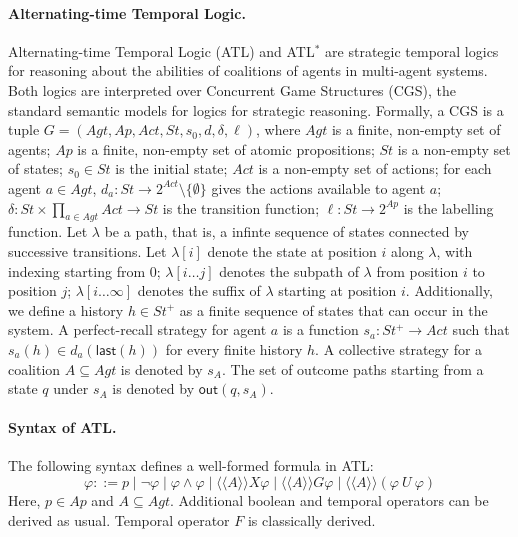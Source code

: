 \paragraph{Alternating-time Temporal Logic.}
Alternating-time Temporal Logic (ATL) and ATL$^\ast$ are strategic temporal logics
for reasoning about the abilities of coalitions of agents in multi-agent systems.
Both logics are interpreted over Concurrent Game Structures (CGS), the standard semantic models for logics for strategic reasoning. Formally, a CGS is a tuple
$G = (Agt, Ap, Act, St, s_0, d, \delta, \ell)$, where $Agt$ is a finite, non-empty set of agents; $Ap$ is a finite, non-empty set of atomic propositions; $St$ is a non-empty set of states; $s_0 \in St$ is the initial state; $Act$ is a non-empty set of actions; for each agent $a \in Agt$, $d_a : St \to 2^{Act} \setminus \{\emptyset\}$ gives the actions available to agent $a$; $\delta : St \times \prod_{a \in Agt} Act \to St$ is the transition function; $\ell : St \to 2^{Ap}$ is the labelling function.
Let $\lambda$ be a path, that is, a infinte sequence of states connected by successive transitions. Let $\lambda[i]$ denote the state at position $i$ along $\lambda$, with indexing starting from $0$; $\lambda[i \dots j]$ denotes the subpath of $\lambda$ from position $i$ to position $j$; $\lambda[i \dots \infty]$ denotes the suffix of $\lambda$ starting at position $i$. Additionally, we define a history $h \in St^+$ as a finite sequence of states that can occur in the system.
A perfect-recall strategy for agent $a$ is a function
$s_a : St^+ \to Act$ such that $s_a(h) \in d_a(\mathsf{last}(h))$ for every finite history $h$.
A collective strategy for a coalition $A \subseteq Agt$ is denoted by $s_A$.
The set of outcome paths starting from a state $q$ under $s_A$ is denoted by
$\mathsf{out}(q,s_A)$.

\paragraph{Syntax of ATL.}
The following syntax defines a well-formed formula in ATL:
\[
\varphi ::= p \mid \neg \varphi \mid \varphi \wedge \varphi
\mid \langle\!\langle A\rangle\!\rangle X \varphi
\mid \langle\!\langle A\rangle\!\rangle G \varphi
\mid \langle\!\langle A\rangle\!\rangle (\varphi \ U \ \varphi)
\]
Here, $p \in Ap$ and $A \subseteq Agt$. Additional boolean and temporal operators can be derived as usual. Temporal operator $F$ is classically derived.

